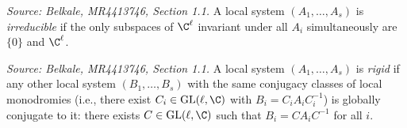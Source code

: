 \begin{definition}[IsIrreducible]
  \label{def:irreducible-local-system}
  \textit{Source: Belkale, MR4413746, Section 1.1.}
  A local system \((A_1, \ldots, A_s)\) is \emph{irreducible} if the only subspaces of \(\C^\ell\) invariant under all \(A_i\) simultaneously are \(\{0\}\) and \(\C^\ell\).
\end{definition}

\begin{definition}[IsRigid]
  \label{def:rigid-local-system}
  \textit{Source: Belkale, MR4413746, Section 1.1.}
  A local system \((A_1, \ldots, A_s)\) is \emph{rigid} if any other local system \((B_1, \ldots, B_s)\) with the same conjugacy classes of local monodromies (i.e., there exist \(C_i \in \mathrm{GL}(\ell, \C)\) with \(B_i = C_i A_i C_i^{-1}\)) is globally conjugate to it: there exists \(C \in \mathrm{GL}(\ell, \C)\) such that \(B_i = C A_i C^{-1}\) for all \(i\).
\end{definition}

